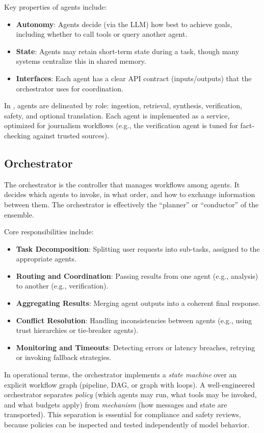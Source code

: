 Key properties of agents include:
\begin{itemize}
    \item \textbf{Autonomy}: Agents decide (via the LLM) how best to achieve goals, including whether to call tools or query another agent.  
    \item \textbf{State}: Agents may retain short-term state during a task, though many systems centralize this in shared memory.  
    \item \textbf{Interfaces}: Each agent has a clear API contract (inputs/outputs) that the orchestrator uses for coordination.  
\end{itemize}

In \ishtar{}, agents are delineated by role: ingestion, retrieval, synthesis, verification, safety, and optional translation. Each agent is implemented as a service, optimized for journalism workflows (e.g., the verification agent is tuned for fact-checking against trusted sources).  

\subsection{Orchestrator}
The orchestrator is the controller that manages workflows among agents. It decides which agents to invoke, in what order, and how to exchange information between them. The orchestrator is effectively the “planner” or “conductor” of the ensemble.  

Core responsibilities include:  
\begin{itemize}
    \item \textbf{Task Decomposition}: Splitting user requests into sub-tasks, assigned to the appropriate agents.  
    \item \textbf{Routing and Coordination}: Passing results from one agent (e.g., analysis) to another (e.g., verification).  
    \item \textbf{Aggregating Results}: Merging agent outputs into a coherent final response.  
    \item \textbf{Conflict Resolution}: Handling inconsistencies between agents (e.g., using trust hierarchies or tie-breaker agents).  
    \item \textbf{Monitoring and Timeouts}: Detecting errors or latency breaches, retrying or invoking fallback strategies.  
\end{itemize}

In operational terms, the orchestrator implements a \emph{state machine} over an explicit workflow graph (pipeline, DAG, or graph with loops).
A well-engineered orchestrator separates \emph{policy} (which agents may run, what tools may be invoked, and what budgets apply) from \emph{mechanism} (how messages and state are transported).
This separation is essential for compliance and safety reviews, because policies can be inspected and tested independently of model behavior.


